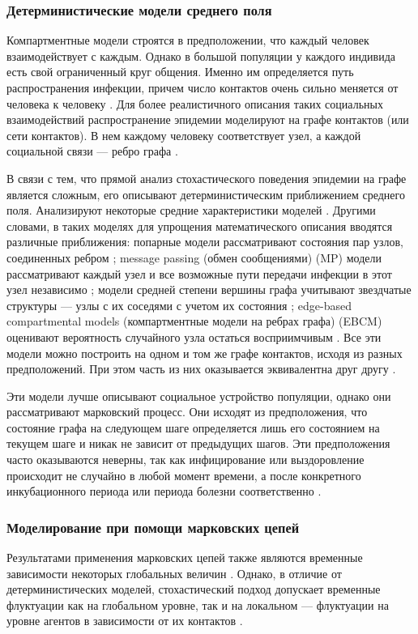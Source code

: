 \documentclass[a4paper,12pt]{article} %
\begin{document}
\subsubsection{Детерминистические модели среднего поля}
Компартментные модели строятся в предположении, что каждый человек взаимодействует с каждым. Однако в большой популяции у каждого индивида есть свой ограниченный круг общения. Именно им определяется путь распространения инфекции, причем число контактов очень сильно меняется от человека к человеку \cite{pastor2001epidemic}. Для более реалистичного описания таких социальных взаимодействий распространение эпидемии моделируют на графе контактов (или сети контактов). В нем каждому человеку соответствует узел, а каждой социальной связи --- ребро графа \cite{sherborne2018mean}.

В связи с тем, что прямой анализ стохастического поведения эпидемии на графе является сложным, его описывают детерминистическим приближением среднего поля. Анализируют некоторые средние характеристики моделей \cite{sherborne2018mean}. Другими словами, в таких моделях для упрощения математического описания вводятся различные приближения: попарные модели рассматривают состояния пар узлов, соединенных ребром \cite{keeling1999effects, house2011insights}; message passing (обмен сообщениями) (MP) модели рассматривают каждый узел и все возможные пути передачи инфекции в этот узел независимо \cite{karrer2010message}; модели средней степени вершины графа учитывают звездчатые структуры --- узлы с их соседями с учетом их состояния \cite{lindquist2011effective}; edge-based compartmental models (компартментные модели на ребрах графа) (EBCM) оценивают вероятность случайного узла остаться восприимчивым \cite{miller2012edge}. Все эти модели можно построить на одном и том же графе контактов, исходя из разных предположений. При этом часть из них оказывается эквивалентна друг другу \cite{sherborne2018mean}.

Эти модели лучше описывают социальное устройство популяции, однако они рассматривают марковский процесс. Они исходят из предположения, что состояние графа на следующем шаге определяется лишь его состоянием на текущем шаге и никак не зависит от предыдущих шагов. Эти предположения часто оказываются неверны, так как инфицирование или выздоровление происходит не случайно в любой момент времени, а после конкретного инкубационного периода или периода болезни соответственно \cite{keeling2005networks,volz2008sir,house2011insights}. 

\subsubsection{Моделирование при помощи марковских цепей}
Результатами применения марковских цепей также являются временные зависимости некоторых глобальных величин \cite{aiello2003new,haas1999temporal}. Однако, в отличие от детерминистических моделей, стохастический подход допускает временные флуктуации как на глобальном уровне, так и на локальном --- флуктуации на уровне агентов в зависимости от их контактов \cite{nakamura2017efficient}.
\end{document}
